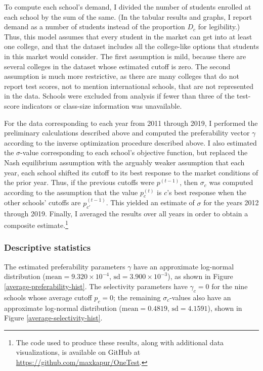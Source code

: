 \documentclass[12pt]{article}
\numberwithin{equation}{subsection}
\theoremstyle{definition}
\begin{document}
To compute each school's demand, I divided the number of students enrolled at each school by the sum of the same. (In the tabular results and graphs, I report demand as a number of students instead of the proportion $D_c$ for legibility.) Thus, this model assumes that every student in the market can get into at least one college, and that the dataset includes all the college-like options that students in this market would consider. The first assumption is mild, because there are several colleges in the dataset whose estimated cutoff is zero. The second assumption is much more restrictive, as there are many colleges that do not report test scores, not to mention international schools, that are not represented in the data. Schools were excluded from analysis if fewer than three of the test-score indicators or class-size information was unavailable. 

For the data corresponding to each year from 2011 through 2019, I performed the preliminary calculations described above and computed the preferability vector $\gamma$ according to the inverse optimization procedure described above. I also estimated the $\sigma$-value corresponding to each school's objective function, but replaced the Nash equilibrium assumption with the arguably weaker assumption that each year, each school shifted its cutoff to its best response to the market conditions of the prior year. Thus, if the previous cutoffs were $p^{(t-1)}$, then $\sigma_c$ was computed according to the assumption that the value $p_c^{(t)}$ is $c$'s best response when the other schools' cutoffs are $p_{c'}^{(t-1)}$. This yielded an estimate of $\sigma$ for the years 2012 through 2019. Finally, I averaged the results over all years in order to obtain a composite estimate.\footnote{The code used to produce these results, along with additional data visualizations, is available on GitHub at \url{https://github.com/maxkapur/OneTest}.}

\subsubsection{Descriptive statistics}
The estimated preferability parameters $\gamma$ have an approximate log-normal distribution ($\text{mean} = 9.320 \times 10^{-4}$, $\text{sd} = 3.900 \times 10^{-3}$), as shown in Figure \ref{average-preferability-hist}. The selectivity parameters have $\gamma_c = 0$ for the nine schools whose average cutoff $p_c = 0$; the remaining $\sigma_c$-values also have an approximate log-normal distribution ($\text{mean} = 0.4819$, $\text{sd} = 4.1591$), shown in Figure \ref{average-selectivity-hist}.
\end{document}
